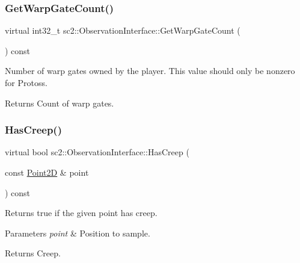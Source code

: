 \subsubsection{\texorpdfstring{Get\+Warp\+Gate\+Count()}{GetWarpGateCount()}}
{\footnotesize\ttfamily virtual int32\+\_\+t sc2\+::\+Observation\+Interface\+::\+Get\+Warp\+Gate\+Count (\begin{DoxyParamCaption}{ }\end{DoxyParamCaption}) const\hspace{0.3cm}{\ttfamily [pure virtual]}}

Number of warp gates owned by the player. This value should only be nonzero for Protoss. \begin{DoxyReturn}{Returns}
Count of warp gates. 
\end{DoxyReturn}
\mbox{\label{classsc2_1_1_observation_interface_a155ebc1b654779ca8bd489d13d91d57c}} 
\subsubsection{\texorpdfstring{Has\+Creep()}{HasCreep()}}
{\footnotesize\ttfamily virtual bool sc2\+::\+Observation\+Interface\+::\+Has\+Creep (\begin{DoxyParamCaption}\item[{const \hyperlink{structsc2_1_1_point2_d}{Point2D} \&}]{point }\end{DoxyParamCaption}) const\hspace{0.3cm}{\ttfamily [pure virtual]}}

Returns \textquotesingle{}true\textquotesingle{} if the given point has creep. 
\begin{DoxyParams}{Parameters}
{\em point} & Position to sample. \\
\hline
\end{DoxyParams}
\begin{DoxyReturn}{Returns}
Creep. 
\end{DoxyReturn}
\mbox{\label{classsc2_1_1_observation_interface_a09ba9ccd3b9c32a6e57d80da3e739a49}} 

